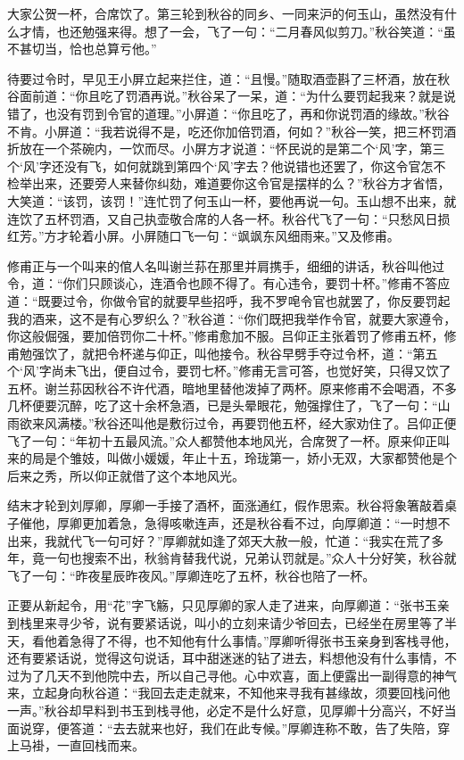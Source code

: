 \documentclass[12pt,UTF8]{ctexbook}
\begin{document}
{{{大家公贺一杯，合席饮了。第三轮到秋谷的同乡、一同来沪的何玉山，虽然没有什么才情，也还勉强来得。想了一会，飞了一句：“二月春风似剪刀。”秋谷笑道：“虽不甚切当，恰也总算亏他。”

待要过令时，早见王小屏立起来拦住，道：“且慢。”随取酒壶斟了三杯酒，放在秋谷面前道：“你且吃了罚酒再说。”秋谷呆了一呆，道：“为什么要罚起我来？就是说错了，也没有罚到令官的道理。”小屏道：“你且吃了，再和你说罚酒的缘故。”秋谷不肯。小屏道：“我若说得不是，吃还你加倍罚酒，何如？”秋谷一笑，把三杯罚酒折放在一个茶碗内，一饮而尽。小屏方才说道：“怀民说的是第二个‘风’字，第三个‘风’字还没有飞，如何就跳到第四个‘风’字去？他说错也还罢了，你这令官怎不检举出来，还要旁人来替你纠劾，难道要你这令官是摆样的么？”秋谷方才省悟，大笑道：“该罚，该罚！”连忙罚了何玉山一杯，要他再说一句。玉山想不出来，就连饮了五杯罚酒，又自己执壶敬合席的人各一杯。秋谷代飞了一句：“只愁风日损红芳。”方才轮着小屏。小屏随口飞一句：“飒飒东风细雨来。”又及修甫。

修甫正与一个叫来的倌人名叫谢兰荪在那里并肩携手，细细的讲话，秋谷叫他过令，道：“你们只顾谈心，连酒令也顾不得了。有心违令，要罚十杯。”修甫不答应道：“既要过令，你做令官的就要早些招呼，我不罗唣令官也就罢了，你反要罚起我的酒来，这不是有心罗织么？”秋谷道：“你们既把我举作令官，就要大家遵令，你这般倔强，要加倍罚你二十杯。”修甫愈加不服。吕仰正主张着罚了修甫五杯，修甫勉强饮了，就把令杯递与仰正，叫他接令。秋谷早劈手夺过令杯，道：“第五个‘风’字尚未飞出，便自过令，要罚七杯。”修甫无言可答，也觉好笑，只得又饮了五杯。谢兰荪因秋谷不许代酒，暗地里替他泼掉了两杯。原来修甫不会喝酒，不多几杯便要沉醉，吃了这十余杯急酒，已是头晕眼花，勉强撑住了，飞了一句：“山雨欲来风满楼。”秋谷还叫他是敷衍过令，再要罚他五杯，经大家劝住了。吕仰正便飞了一句：“年初十五最风流。”众人都赞他本地风光，合席贺了一杯。原来仰正叫来的局是个雏妓，叫做小媛媛，年止十五，玲珑第一，娇小无双，大家都赞他是个后来之秀，所以仰正就借了这个本地风光。

结末才轮到刘厚卿，厚卿一手接了酒杯，面涨通红，假作思索。秋谷将象箸敲着桌子催他，厚卿更加着急，急得咳嗽连声，还是秋谷看不过，向厚卿道：“一时想不出来，我就代飞一句可好？”厚卿就如逢了郊天大赦一般，忙道：“我实在荒了多年，竟一句也搜索不出，秋翁肯替我代说，兄弟认罚就是。”众人十分好笑，秋谷就飞了一句：“昨夜星辰昨夜风。”厚卿连吃了五杯，秋谷也陪了一杯。

正要从新起令，用“花”字飞觞，只见厚卿的家人走了进来，向厚卿道：“张书玉亲到栈里来寻少爷，说有要紧话说，叫小的立刻来请少爷回去，已经坐在房里等了半天，看他着急得了不得，也不知他有什么事情。”厚卿听得张书玉亲身到客栈寻他，还有要紧话说，觉得这句说话，耳中甜迷迷的钻了进去，料想他没有什么事情，不过为了几天不到他院中去，所以自己寻他。心中欢喜，面上便露出一副得意的神气来，立起身向秋谷道：“我回去走走就来，不知他来寻我有甚缘故，须要回栈问他一声。”秋谷却早料到书玉到栈寻他，必定不是什么好意，见厚卿十分高兴，不好当面说穿，便答道：“去去就来也好，我们在此专候。”厚卿连称不敢，告了失陪，穿上马褂，一直回栈而来。

}}}
\end{document}
